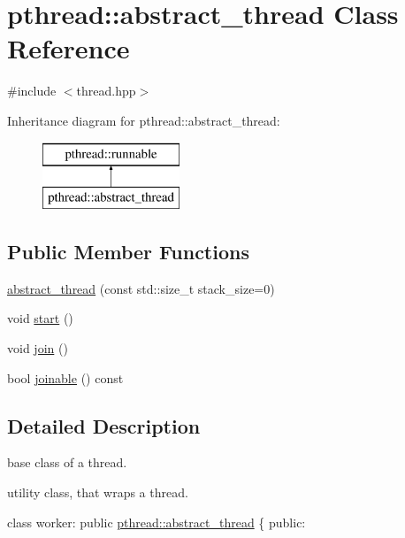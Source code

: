 \hypertarget{classpthread_1_1abstract__thread}{\section{pthread\+:\+:abstract\+\_\+thread Class Reference}
\label{classpthread_1_1abstract__thread}
}


{\ttfamily \#include $<$thread.\+hpp$>$}

Inheritance diagram for pthread\+:\+:abstract\+\_\+thread\+:\begin{figure}[H]
\begin{center}
\leavevmode
\includegraphics[height=2.000000cm]{classpthread_1_1abstract__thread}
\end{center}
\end{figure}
\subsection*{Public Member Functions}
\begin{DoxyCompactItemize}
\item 
\hyperlink{classpthread_1_1abstract__thread_aef9de5da73087b69d00f71985a4cbdef}{abstract\+\_\+thread} (const std\+::size\+\_\+t stack\+\_\+size=0)
\item 
void \hyperlink{classpthread_1_1abstract__thread_ab121718028f3ca68d45db84d10ff2a3a}{start} ()
\item 
void \hyperlink{classpthread_1_1abstract__thread_a2fb144a8b7d368ed7c4e193cfb89489d}{join} ()
\item 
bool \hyperlink{classpthread_1_1abstract__thread_ab09402f41e10770eb9987fda101ad827}{joinable} () const 
\end{DoxyCompactItemize}


\subsection{Detailed Description}
base class of a thread.

utility class, that wraps a thread. 
\begin{DoxyPre}{\ttfamily 
class worker: public \hyperlink{classpthread_1_1abstract__thread}{pthread::abstract\_thread} \{
public:}\end{DoxyPre}



